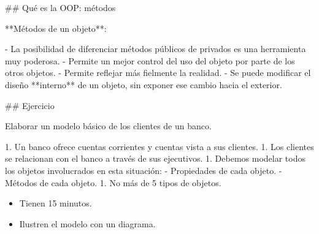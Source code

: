 ## Qué es la OOP: métodos

**Métodos de un objeto**:

- La posibilidad de diferenciar métodos públicos de privados es una herramienta muy poderosa.
- Permite un mejor control del uso del objeto por parte de los otros objetos.
- Permite reflejar más fielmente la realidad.
- Se puede modificar el diseño **interno** de un objeto, sin exponer ese cambio hacia el exterior.

## Ejercicio

Elaborar un modelo básico de los clientes de un banco.

1. Un banco ofrece cuentas corrientes y cuentas vista a sus clientes.
1. Los clientes se relacionan con el banco a través de sus ejecutivos.
1. Debemos modelar todos los objetos involucrados en esta situación:
    - Propiedades de cada objeto.
    - Métodos de cada objeto.
1. No más de 5 tipos de objetos.\vfill


\begin{center}\begin{customRoundedBox}{}%
\begin{itemize}
  \item Tienen 15 minutos.
  \item Ilustren el modelo con un diagrama.
\end{itemize}
\end{customRoundedBox}
\end{center}

